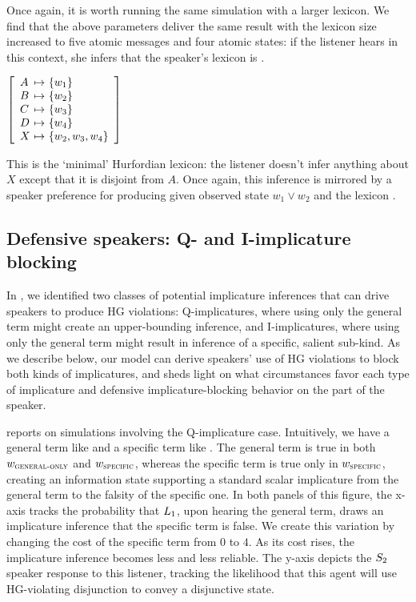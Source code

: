 \documentclass[12pt,twoside]{article}
\renewcommand{\_}{\textbf{\textunderscore\hspace{-4pt}\textunderscore\hspace{-3pt}\textunderscore\hspace{-4pt}\textunderscore}\hspace{0.5pt}}			%
\begin{document}
Once again, it is worth running the same simulation with a larger
lexicon. We find that the above parameters deliver the same result
with the lexicon size increased to five atomic messages and four
atomic states: if the listener hears  in this context,
she infers that the speaker's lexicon is .
%
\begin{exe}
\ex\label{hurford-lex-large}  
  $\left[
    \begin{array}[c]{l@{ \ \mapsto \ }l}
      A & \set{w_{1}} \\
      B & \set{w_{2}} \\
      C & \set{w_{3}} \\
      D & \set{w_{4}} \\
      X & \set{w_{2}, w_{3}, w_{4}}
    \end{array}
  \right]$
\end{exe}
%
This is the `minimal' Hurfordian lexicon: the listener doesn't infer
anything about $X$ except that it is disjoint from $A$. Once again,
this inference is mirrored by a speaker preference for producing
 given observed state $w_{1} \vee w_{2}$ and the lexicon
.


\subsection{Defensive speakers: Q- and I-implicature blocking}
\label{sec:defensive-speakers}



In , we identified two classes of
potential implicature inferences that can drive speakers to produce HG
violations: Q-implicatures, where using only the general term might
create an upper-bounding inference, and I-implicatures, where using
only the general term might result in inference of a specific, salient
sub-kind. As we describe below, our model can derive speakers' use of
HG violations to block both kinds of implicatures, and sheds light on
what circumstances favor each type of implicature and defensive
implicature-blocking behavior on the part of the speaker.

 reports on simulations involving the Q-implicature
case. Intuitively, we have a general term like  and a
specific term like . The general term is true in both
$w_\textsc{general-only}$ and $w_\textsc{specific}$, whereas the
specific term is true only in $w_\textsc{specific}$, creating an
information state supporting a standard scalar implicature from the
general term to the falsity of the specific one.  In both panels of
this figure, the x-axis tracks the probability that $\ListenerK[1]$,
upon hearing the general term, draws an implicature inference that the
specific term is false. We create this variation by changing the cost
of the specific term from $0$ to $4$. As its cost rises, the
implicature inference becomes less and less reliable.  The y-axis
depicts the $\SpeakerK[2]$ speaker response to this listener, tracking
the likelihood that this agent will use HG-violating disjunction to
convey a disjunctive state.
\end{document}
